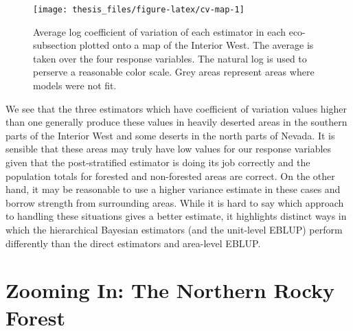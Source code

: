 \documentclass[12pt,twoside]{reedthesis}
\begin{document}
\clearpage
\begin{figure}

{\centering \texttt{[image: thesis\_files/figure-latex/cv-map-1]} 

}

\caption[Coefficient of variation map]{Average log coefficient of variation of each estimator in each eco-subsection plotted onto a map of the Interior West. The average is taken over the four response variables. The natural log is used to perserve a reasonable color scale. Grey areas represent areas where models were not fit.}\label{fig:cv-map}
\end{figure}
We see that the three estimators which have coefficient of variation values higher than one generally produce these values in heavily deserted areas in the southern parts of the Interior West and some deserts in the north parts of Nevada. It is sensible that these areas may truly have low values for our response variables given that the post-stratified estimator is doing its job correctly and the population totals for forested and non-forested areas are correct. On the other hand, it may be reasonable to use a higher variance estimate in these cases and borrow strength from surrounding areas. While it is hard to say which approach to handling these situations gives a better estimate, it highlights distinct ways in which the hierarchical Bayesian estimators (and the unit-level EBLUP) perform differently than the direct estimators and area-level EBLUP.

\hypertarget{zooming-in-the-northern-rocky-forest}{%
\section{Zooming In: The Northern Rocky Forest}\label{zooming-in-the-northern-rocky-forest}}
\end{document}
